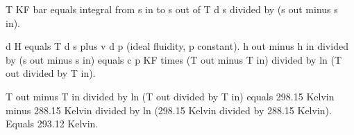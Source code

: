 T KF bar equals integral from s in to s out of T d s divided by (s out minus s in).  

d H equals T d s plus v d p (ideal fluidity, p constant).  
h out minus h in divided by (s out minus s in) equals c p KF times (T out minus T in) divided by ln (T out divided by T in).  

T out minus T in divided by ln (T out divided by T in) equals 298.15 Kelvin minus 288.15 Kelvin divided by ln (298.15 Kelvin divided by 288.15 Kelvin).  
Equals 293.12 Kelvin.